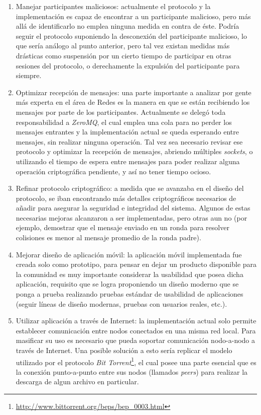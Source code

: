 \begin{enumerate}
    \item Manejar participantes maliciosos: actualmente el protocolo y la 
    implementación es capaz de encontrar a un participante malicioso, pero más 
    allá de identificarlo no emplea ninguna medida en contra de éste. Podría 
    seguir el protocolo suponiendo la desconexión del participante malicioso, 
    lo que sería análogo al punto anterior, pero tal vez existan medidas más 
    drásticas como suspensión por un cierto tiempo de participar en otras 
    sesiones del protocolo, o derechamente la expulsión del participante para 
    siempre. 
    
    \item Optimizar recepción de mensajes: una parte importante a analizar por 
    gente más experta en el área de Redes es la manera en que se están 
    recibiendo los mensajes por parte de los participantes. Actualmente se 
    delegó toda responsabilidad a \emph{ZeroMQ}, el cual emplea una cola para 
    no perder los mensajes entrantes y la implementación actual se queda 
    esperando entre mensajes, sin realizar ninguna operación. Tal vez sea 
    necesario revisar ese protocolo y optimizar la recepción de mensajes, 
    abriendo múltiples \emph{sockets}, o utilizando el tiempo de espera entre 
    mensajes para poder realizar alguna operación criptográfica pendiente, y 
    así no tener tiempo ocioso.
    
    \item Refinar protocolo criptográfico: a medida que se avanzaba en el 
    diseño del protocolo, se iban encontrando más detalles criptográficos 
    necesarios de añadir para asegurar la seguridad e integridad del sistema. 
    Algunos de estas necesarias mejoras alcanzaron a ser implementadas, pero 
    otras aun no (por ejemplo, demostrar que el mensaje enviado en un ronda 
    para resolver colisiones es menor al mensaje promedio de la ronda padre).
    
    \item Mejorar diseño de aplicación móvil: la aplicación móvil implementada 
    fue creada solo como prototipo, para pensar en dejar un producto 
    disponible para la comunidad es muy importante considerar la usabilidad 
    que posea dicha aplicación, requisito que se logra proponiendo un diseño 
    moderno que se ponga a prueba realizando pruebas estándar de usabilidad de 
    aplicaciones (seguir líneas de diseño modernas, pruebas con usuarios 
    reales, etc.).
    
    \item Utilizar aplicación a través de Internet: la implementación actual 
    solo permite establecer comunicación entre nodos conectados en una misma 
    red local. Para masificar su uso es necesario que pueda soportar 
    comunicación nodo-a-nodo a través de Internet. Una posible solución a esto 
    sería replicar el modelo utilizado por el protocolo 
    \emph{Bit Torrent}\footnote{\url{http://www.bittorrent.org/beps/bep_0003.html}}, el cual posee una parte esencial que es la conexión 
    punto-a-punto entre sus nodos (llamados \emph{peers}) para realizar la 
    descarga de algun archivo en particular.
    

\end{enumerate}
